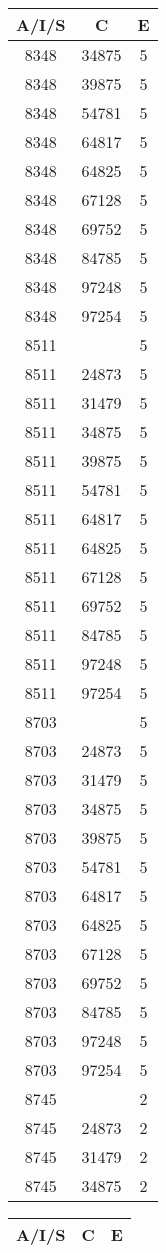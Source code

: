 {{\begin{tabular}{|c|c||c|}
        \hline
        \bf A/I/S & \bf C & \bf E \\
        \hline
8348&34875&5\\ 8348&39875&5\\ 8348&54781&5\\ 8348&64817&5\\ 8348&64825&5\\ 8348&67128&5\\ 8348&69752&5\\ 8348&84785&5\\ 8348&97248&5\\ 8348&97254&5\\ 8511& &5\\ 8511&24873&5\\ 8511&31479&5\\ 8511&34875&5\\ 8511&39875&5\\ 8511&54781&5\\ 8511&64817&5\\ 8511&64825&5\\ 8511&67128&5\\ 8511&69752&5\\ 8511&84785&5\\ 8511&97248&5\\ 8511&97254&5\\ 8703& &5\\ 8703&24873&5\\ 8703&31479&5\\ 8703&34875&5\\ 8703&39875&5\\ 8703&54781&5\\ 8703&64817&5\\ 8703&64825&5\\ 8703&67128&5\\ 8703&69752&5\\ 8703&84785&5\\ 8703&97248&5\\ 8703&97254&5\\ 8745& &2\\ 8745&24873&2\\ 8745&31479&2\\ 8745&34875&2\\ 
        \hline
        \end{tabular}
        \quad
        \begin{tabular}{|c|c||c|}
        \hline
        \bf A/I/S & \bf C & \bf E \\
        \hline

\end{tabular}}}
